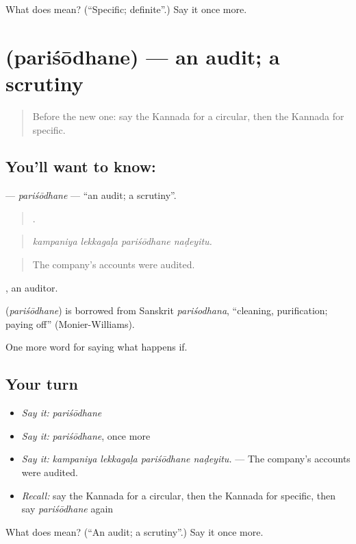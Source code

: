 \begin{tcolorbox}[breakable,colback=teal!4,colframe=teal!35!black,title={Before you move on}]
What does  mean? (\textquotedblleft{}Specific; definite\textquotedblright{}.) Say it once more.
\end{tcolorbox}
\section[\texorpdfstring{\kn{ಪರಿಶೋಧನೆ} (pariśōdhane)}{ಪರಿಶೋಧನೆ (pariśōdhane)}]{ (pariśōdhane) — an audit; a scrutiny}

\label{lesson:KA-C424-parisodhane}



\begin{quote}
Before the new one: say the Kannada for a circular, then the Kannada for specific.
\end{quote}

\subsection*{You'll want to know: }
\textbf{} — \emph{pariśōdhane} — \textquotedblleft{}an audit; a scrutiny\textquotedblright{}.

\begin{quote}
   .
\end{quote}

\begin{quote}
\emph{kampaniya lekkagaḷa pariśōdhane naḍeyitu.}
\end{quote}

\begin{quote}
The company's accounts were audited.
\end{quote}

, an auditor.

\begin{cousinweb}
\textbf{} (\emph{pariśōdhane}) is borrowed from Sanskrit \emph{pariśodhana}, \textquotedblleft{}cleaning, purification; paying off\textquotedblright{} (Monier-Williams).
\end{cousinweb}

\begin{grammarlens}[title={What you've built}]
One more word for saying what happens if.
\end{grammarlens}

\subsection*{Your turn}
\begin{itemize}
\raggedright
  \item \emph{Say it:} \emph{pariśōdhane}
  \item \emph{Say it:} \emph{pariśōdhane}, once more
  \item \emph{Say it:} \emph{kampaniya lekkagaḷa pariśōdhane naḍeyitu.} — The company's accounts were audited.
  \item \emph{Recall:} say the Kannada for a circular, then the Kannada for specific, then say \emph{pariśōdhane} again
\end{itemize}

\begin{tcolorbox}[breakable,colback=teal!4,colframe=teal!35!black,title={Before you move on}]
What does  mean? (\textquotedblleft{}An audit; a scrutiny\textquotedblright{}.) Say it once more.
\end{tcolorbox}
